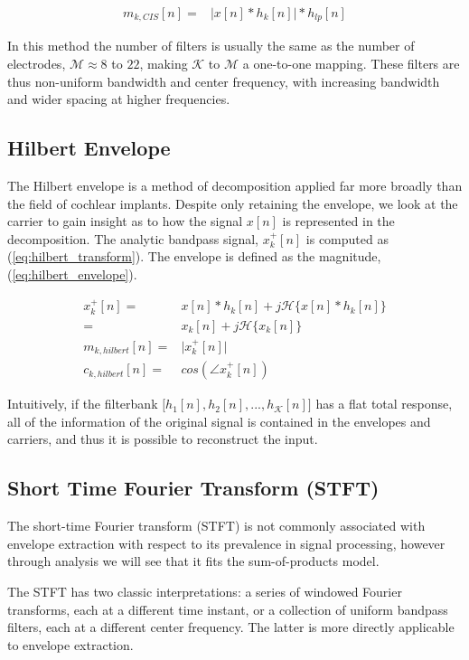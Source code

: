 \documentclass [11pt, proquest,oneside] {ganter_thesis}[2015/03/03]
\begin{document}
\begin{align}
\label{eq:cis_envelope}
m_{k,CIS}[n] =& \Big| x[n] * h_k[n] \Big| * h_{lp}[n]
\end{align}

In this method the number of filters is usually the same as the number of electrodes, $\mathcal{M} \approx 8$ to $22$, making $\mathcal{K}$ to $\mathcal{M}$ a one-to-one mapping.  These filters are thus non-uniform bandwidth and center frequency, with increasing bandwidth and wider spacing at higher frequencies.

\subsection{Hilbert Envelope}

The Hilbert envelope is a method of decomposition applied far more broadly than the field of cochlear implants.  Despite only retaining the envelope, we look at the carrier to gain insight as to how the signal $x[n]$ is represented in the decomposition.  The analytic bandpass signal, $x^+_k[n]$ is computed as (\ref{eq:hilbert_transform}).  The envelope is defined as the magnitude, (\ref{eq:hilbert_envelope}).

\begin{align}
\label{eq:hilbert_transform}
x_k^+[n] =& x[n] * h_k[n] + j\mathcal{H}\{x[n] * h_k[n]\} \nonumber \\
=& x_k[n] + j\mathcal{H}\{x_k[n]\} \\
\label{eq:hilbert_envelope}
m_{k,hilbert}[n] =& \Big| x^+_k[n] \Big| \\
c_{k,hilbert}[n] =& cos(\angle x^+_k[n])
\end{align}

Intuitively, if the filterbank $\Big[h_1[n], h_2[n], ...,h_\mathcal{K}[n]\Big]$ has a flat total response, all of the information of the original signal is contained in the envelopes and carriers, and thus it is possible to reconstruct the input.

\subsection{Short Time Fourier Transform (STFT)}

The short-time Fourier transform (STFT) is not commonly associated with envelope extraction with respect to its prevalence in signal processing, however through analysis we will see that it fits the sum-of-products model.

The STFT has two classic interpretations: a series of windowed Fourier transforms, each at a different time instant, or a collection of uniform bandpass filters, each at a different center frequency.  The latter is more directly applicable to envelope extraction.
\end{document}
